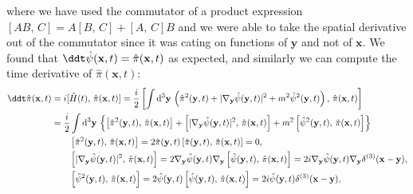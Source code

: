 where we have used the commutator of a product expression \([AB,\,C] = A[B,\,C]+[A,\,C]B\) and we were able to take the spatial derivative out of the commutator since it was cating on functions of \(\mathbf{y}\) and not of \(\mathbf{x}\). We found that \(\ddt \hat{\psi} (\mathbf{x}, t) = \hat{\pi}(\mathbf{x}, t)\) as expected, and similarly we can compute the time derivative of \(\hat{\pi}(\mathbf{x}, t)\):
\[
    \begin{aligned}
        \ddt \hat{\pi} (\mathbf{x}, t) & = i [\hat{H}(t),\,\hat{\pi}(\mathbf{x}, t)] = \frac{i}{2} \left[\int \mathrm{d}^3 \mathbf{y} \, \left( \hat{\pi}^2(\mathbf{y},t) + \vert \nabla_{\mathbf{y}}  \hat{\psi}(\mathbf{y},t) \vert^2 + m^2 \hat{\psi}^2(\mathbf{y},t) \right),\,\hat{\pi}(\mathbf{x}, t)\right]                                                                               \\
                                       & = \frac{i}{2} \int \mathrm{d}^3 \mathbf{y} \, \left\{ \left[ \hat{\pi}^2(\mathbf{y},t),\,\hat{\pi}(\mathbf{x}, t) \right] + \left[ \vert \nabla_{\mathbf{y}} \hat{\psi}(\mathbf{y},t) \vert^2,\,\hat{\pi}(\mathbf{x},t)\right] + m^2 \left[ \hat{\psi}^2(\mathbf{y},t),\,\hat{\pi}(\mathbf{x}, t) \right] \right\}                                      \\
                                       & \qquad \left[ \hat{\pi}^2(\mathbf{y},t),\,\hat{\pi}(\mathbf{x}, t) \right] = 2\hat{\pi}(\mathbf{y},t)\left[ \hat{\pi}(\mathbf{y},t),\,\hat{\pi}(\mathbf{x}, t) \right] = 0,                                                                                                                                                                             \\
                                       & \qquad \left[ \vert \nabla_{\mathbf{y}} \hat{\psi}(\mathbf{y},t) \vert^2,\,\hat{\pi}(\mathbf{x},t)\right] = 2 \nabla_{\mathbf{y}}\hat{\psi}(\mathbf{y},t) \nabla_{\mathbf{y}}\left[\hat{\psi}(\mathbf{y},t) ,\,\hat{\pi}(\mathbf{x},t)\right] = 2i \nabla_{\mathbf{y}}\hat{\psi}(\mathbf{y},t) \nabla_{\mathbf{y}} \delta^{(3)}(\mathbf{x}-\mathbf{y}), \\
                                       & \qquad \left[ \hat{\psi}^2(\mathbf{y},t),\,\hat{\pi}(\mathbf{x}, t) \right] = 2 \hat{\psi}(\mathbf{y},t)\left[ \hat{\psi}(\mathbf{y},t),\,\hat{\pi}(\mathbf{x}, t) \right] = 2i\hat{\psi}(\mathbf{y},t)\delta^{(3)}(\mathbf{x}-\mathbf{y}),                                                                                                             \\

\end{aligned}\]
